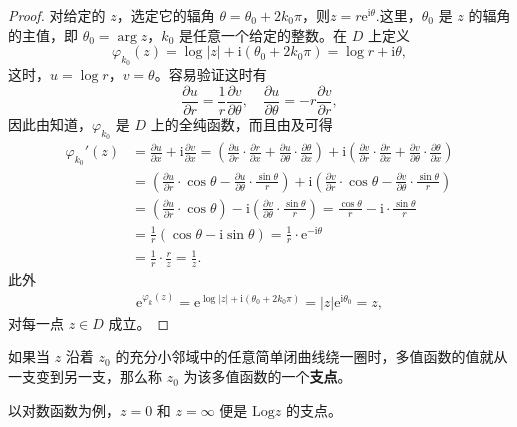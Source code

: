 \documentclass[../../main.tex]{subfiles}
\begin{document}
\begin{proof}
对给定的 \( z \)，选定它的辐角 \( \theta = \theta_0 + 2k_0\pi \)，则$z=r\mathrm{e}^{\mathrm{i}\theta}$.这里，\( \theta_0 \) 是 \( z \) 的辐角的主值，即 \( \theta_0 = \arg z \)，\( k_0 \) 是任意一个给定的整数。在 \( D \) 上定义
\[
\varphi_{k_0}(z) = \log|z| + \mathrm{i}(\theta_0 + 2k_0\pi) = \log r + \mathrm{i}\theta,
\]
这时，\( u = \log r \)，\( v = \theta \)。容易验证这时有
\[
\frac{\partial u}{\partial r} = \frac{1}{r} \frac{\partial v}{\partial \theta},\quad 
\frac{\partial u}{\partial \theta} = -r \frac{\partial v}{\partial r},
\]
因此由知道，\( \varphi_{k_0} \) 是 \( D \) 上的全纯函数，而且由及可得
\begin{align*}
\varphi _{k_0}'(z)&=\frac{\partial u}{\partial x}+\mathrm{i}\frac{\partial v}{\partial x}=\left( \frac{\partial u}{\partial r}\cdot \frac{\partial r}{\partial x}+\frac{\partial u}{\partial \theta}\cdot \frac{\partial \theta}{\partial x} \right) +\mathrm{i}\left( \frac{\partial v}{\partial r}\cdot \frac{\partial r}{\partial x}+\frac{\partial v}{\partial \theta}\cdot \frac{\partial \theta}{\partial x} \right) 
\\
&=\left( \frac{\partial u}{\partial r}\cdot \cos \theta -\frac{\partial u}{\partial \theta}\cdot \frac{\sin \theta}{r} \right) +\mathrm{i}\left( \frac{\partial v}{\partial r}\cdot \cos \theta -\frac{\partial v}{\partial \theta}\cdot \frac{\sin \theta}{r} \right) 
\\
&=\left( \frac{\partial u}{\partial r}\cdot \cos \theta \right) -\mathrm{i}\left( \frac{\partial v}{\partial \theta}\cdot \frac{\sin \theta}{r} \right) =\frac{\cos \theta}{r}-\mathrm{i}\cdot \frac{\sin \theta}{r}
\\
&=\frac{1}{r}\left( \cos \theta -\mathrm{i}\sin \theta \right) =\frac{1}{r}\cdot \mathrm{e}^{-\mathrm{i}\theta}
\\
&=\frac{1}{r}\cdot \frac{r}{z}=\frac{1}{z}.
\end{align*}
此外
\begin{align*}
\mathrm{e}^{\varphi_k(z)} = \mathrm{e}^{\log|z| + \mathrm{i}(\theta_0 + 2k_0\pi)} = |z| \mathrm{e}^{\mathrm{i}\theta_0} = z,
\end{align*}
对每一点 \( z \in D \) 成立。

\end{proof}

\begin{definition}
如果当 \( z \) 沿着 \( z_0 \) 的充分小邻域中的任意简单闭曲线绕一圈时，多值函数的值就从一支变到另一支，那么称 \( z_0 \) 为该多值函数的一个\textbf{支点}。
\end{definition}
\begin{note}
以对数函数为例，\( z = 0 \) 和 \( z = \infty \) 便是 \( \mathrm{Log} z \) 的支点。
\end{note}
\end{document}
